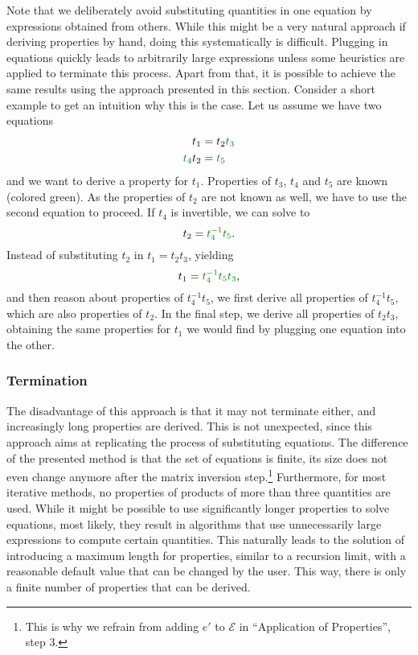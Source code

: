 Note that we deliberately avoid substituting quantities in one equation by expressions obtained from others. While this might be a very natural approach if deriving properties by hand, doing this systematically is difficult. Plugging in equations quickly leads to arbitrarily large expressions unless some heuristics are applied to terminate this process. Apart from that, it is possible to achieve the same results using the approach presented in this section. Consider a short example to get an intuition why this is the case. Let us assume we have two equations
%
\begin{align*}
t_1 &= t_2 {\color{green!50!black} t_3} \\
{\color{green!50!black}t_4} t_2 &= {\color{green!50!black}t_5}
\end{align*}
%
and we want to derive a property for $t_1$. Properties of $t_3$, $t_4$ and $t_5$ are known (colored green). As the properties of $t_2$ are not known as well, we have to use the second equation to proceed. If $t_4$ is invertible, we can solve to
%
$$t_2 = {\color{green!50!black}t_4^{-1}} {\color{green!50!black}t_5} \text{.}$$
%
Instead of substituting $t_2$ in $t_1 = t_2 t_3$, yielding
%
$$t_1 = {\color{green!50!black}t_4^{-1}} {\color{green!50!black}t_5} {\color{green!50!black} t_3} \text{,}$$
%
and then reason about properties of $t_4^{-1} t_5$, we first derive all properties of $t_4^{-1} t_5$, which are also properties of $t_2$. In the final step, we derive all properties of $t_2 t_3$, obtaining the same properties for $t_1$ we would find by plugging one equation into the other.

\subsubsection{Termination}

The disadvantage of this approach is that it may not terminate either, and increasingly long properties are derived. This is not unexpected, since this approach aims at replicating the process of substituting equations. The difference of the presented method is that the set of equations is finite, its size does not even change anymore after the matrix inversion step.\footnote{This is why we refrain from adding $e'$ to $\mathcal{E}$ in ``Application of Properties'', step 3.} Furthermore, for most iterative methods, no properties of products of  more than three quantities are used. While it might be possible to use significantly longer properties to solve equations, most likely, they result in algorithms that use unnecessarily large expressions to compute certain quantities. This naturally leads to the solution of introducing a maximum length for properties, similar to a recursion limit, with a reasonable default value that can be changed by the user. This way, there is only a finite number of properties that can be derived. 

